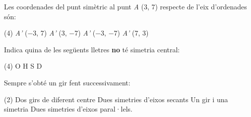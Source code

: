 \begin{autoaval}{52}
\begin{mylist}
\exer Les coordenades del punt simètric al punt \textit{A} (3, 7) respecte de l'eix d'ordenades són:
\begin{tasks}(4)
	\task  \textit{A'} ($-$3, 7)   
	\task  \textit{A'} (3, $-$7)    
	\task  \textit{A'} ($-$3, $-$7)  
	\task \textit{ A'} (7, 3)
\end{tasks}

\exer Indica quina de les següents lletres \textbf{no }té simetria central:
\begin{tasks}(4)
	\task  O     
	\task  H    
	\task  S   
	\task  D
\end{tasks}

\exer Sempre s'obté un gir fent successivament:
\begin{tasks}(2)
	\task  Dos girs de diferent centre   
	\task  Dues simetries d'eixos secants
	\task  Un gir i una simetria    
	\task  Dues simetries d'eixos paral·lels.
\end{tasks}

\end{mylist}
\end{autoaval}

